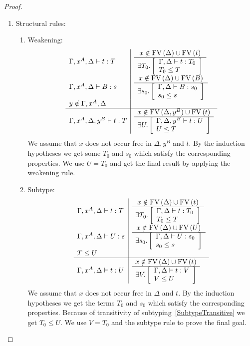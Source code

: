 \begin{lemma}
\begin{proof}
{\begin{enumerate}
\begin{enumerate}
                Since $B_1$ is a valid type in the context $\Gamma,\Delta$ and a
                supertype of $B_0$ we get $\Gamma,\Delta \vdash b: B_1$ which
                implies by the consequences of the first induction hypothesis
                and the application introduction rule $\Gamma,\Delta \vdash f a:
                C_1[y:=b]$. I.e. we can use $U = C_1[y:=b]$ to prove the final
                goal.
            \end{enumerate}
            \item Structural rules:
            \begin{enumerate}
                \item Weakening:
                $$
                \begin{array}{l|l}
                    \Gamma,x^A,\Delta \vdash t : T
                    &
                    \begin{array}{c}  x \notin \text{FV}\, (\Delta) \cup \text{FV}\, (t)  \\ \hline  \exists T_0. \left[ \begin{array}{l} \Gamma,\Delta \vdash t : T_0 \\ T_0 \le T \end{array} \right] \end{array}
                    \\
                    \Gamma,x^A,\Delta \vdash B : s
                    &
                    \begin{array}{c}  x \notin \text{FV}\, (\Delta) \cup \text{FV}\, (B)  \\ \hline  \exists s_0. \left[ \begin{array}{l} \Gamma,\Delta \vdash B : s_0 \\ s_0 \le s \end{array} \right] \end{array}
                    \\
                    y \notin \Gamma,x^A,\Delta
                    \\
                    \hline
                    \Gamma,x^A,\Delta,y^B \vdash t : T
                    &
                    \begin{array}{c}  x \notin \text{FV}\, (\Delta,y^B) \cup \text{FV}\, (t)  \\ \hline  \exists U. \left[ \begin{array}{l} \Gamma,\Delta,y^B \vdash t : U \\ U \le T \end{array} \right] \end{array}
                \end{array}
                $$
                We assume that $x$ does not occur free in $\Delta,y^B$ and $t$.
                    By the induction hypotheses we get some $T_0$ and $s_0$
                    which satisfy the corresponding properties. We use $U = T_0$
                    and get the final result by applying the weakening rule.

                \item Subtype:
                $$
                \begin{array}{l|l}
                    \Gamma,x^A,\Delta \vdash t : T
                    &
                    \begin{array}{c}  x \notin \text{FV}\, (\Delta) \cup \text{FV}\, (t)  \\ \hline  \exists T_0. \left[ \begin{array}{l} \Gamma,\Delta \vdash t : T_0 \\ T_0 \le T \end{array} \right] \end{array}
                    \\
                    \Gamma,x^A,\Delta \vdash U : s
                    &
                    \begin{array}{c}  x \notin \text{FV}\, (\Delta) \cup \text{FV}\, (U)  \\ \hline  \exists s_0. \left[ \begin{array}{l} \Gamma,\Delta \vdash U : s_0 \\ s_0 \le s \end{array} \right] \end{array}
                    \\
                    T \le U
                    \\
                    \hline
                    \Gamma,x^A,\Delta \vdash t : U
                    &
                    \begin{array}{c}  x \notin \text{FV}\, (\Delta) \cup \text{FV}\, (t)  \\ \hline  \exists V. \left[ \begin{array}{l} \Gamma,\Delta \vdash t : V \\ V \le U \end{array} \right] \end{array}
                \end{array}
                $$
                We assume that $x$ does not occur free in $\Delta$ and $t$. By
                    the induction hypotheses we get the terms $T_0$ and $s_0$
                    which satisfy the corresponding properties. Because of
                    transitivity of subtyping~\ref{SubtypeTransitive} we get $T_0
                    \le U$. We use $V = T_0$ and the subtype rule to prove the
                    final goal.


\end{enumerate}
\end{enumerate}}
\end{proof}
\end{lemma}
